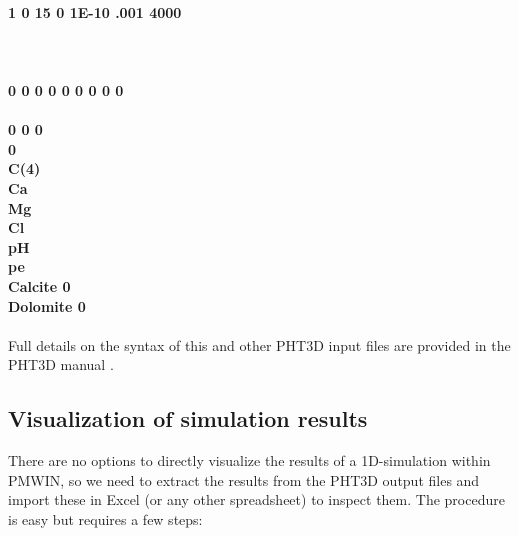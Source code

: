 {\color{blue} \footnotesize  \textbf{
\\
 1  0 15 0 1E-10 .001 4000 \\
  \\
  \\
  \\
 0 0 0 0 0 0 0 0 0\\
  \\
             0             0             0  \\
             0  \\
\indent C(4) \\
\indent Ca \\
\indent Mg \\
\indent Cl \\
\indent pH \\
\indent pe \\
\indent Calcite 0\\
\indent Dolomite 0\\
}}
\\
\label{interface_file}
Full details on the syntax of this and other PHT3D input files are provided 
in the PHT3D manual \citep[]{pht3d}.

\subsection[Visualization of simulation results]{Visualization of simulation results}

There are no options to directly visualize the results of a 1D-simulation within PMWIN, so we need to extract the results from the PHT3D output files and import these in Excel (or any other spreadsheet) to inspect them. The procedure is easy but requires a few steps:

